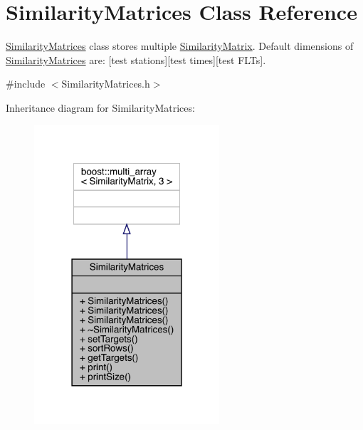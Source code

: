 \hypertarget{class_similarity_matrices}{}\section{Similarity\+Matrices Class Reference}
\label{class_similarity_matrices}


\mbox{\hyperlink{class_similarity_matrices}{Similarity\+Matrices}} class stores multiple \mbox{\hyperlink{class_similarity_matrix}{Similarity\+Matrix}}. Default dimensions of \mbox{\hyperlink{class_similarity_matrices}{Similarity\+Matrices}} are\+: \mbox{[}test stations\mbox{]}\mbox{[}test times\mbox{]}\mbox{[}test F\+L\+Ts\mbox{]}.  




{\ttfamily \#include $<$Similarity\+Matrices.\+h$>$}



Inheritance diagram for Similarity\+Matrices\+:
\nopagebreak
\begin{figure}[H]
\begin{center}
\leavevmode
\includegraphics[width=195pt]{class_similarity_matrices__inherit__graph}
\end{center}
\end{figure}


